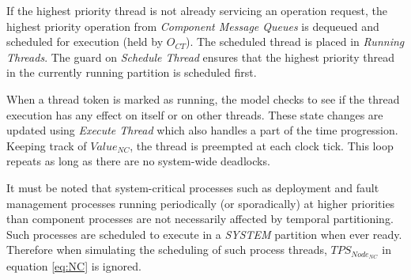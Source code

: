 If the highest priority thread is not already servicing an operation request, the highest priority operation from \emph{Component Message Queues} is dequeued and scheduled for execution (held by $O_{CT}$). The scheduled thread is placed in \emph{Running Threads}. The guard on \emph{Schedule Thread} ensures that the highest priority thread in the currently running partition is scheduled first. 

When a thread token is marked as running, the model checks to see if the thread execution has any effect on itself or on other threads. These state changes are updated using \emph{Execute Thread} which also handles a part of the time progression. Keeping track of $Value_{NC}$, the thread is preempted at each clock tick. This loop repeats as long as there are no system-wide deadlocks. 

It must be noted that system-critical processes such as deployment and fault management processes running periodically (or sporadically) at higher priorities than component processes are not necessarily affected by temporal partitioning. Such processes are scheduled to execute in a \emph{SYSTEM} partition when ever ready. Therefore when simulating the scheduling of such process threads, $TPS_{Node_{NC}}$ in equation \ref{eq:NC} is ignored.




